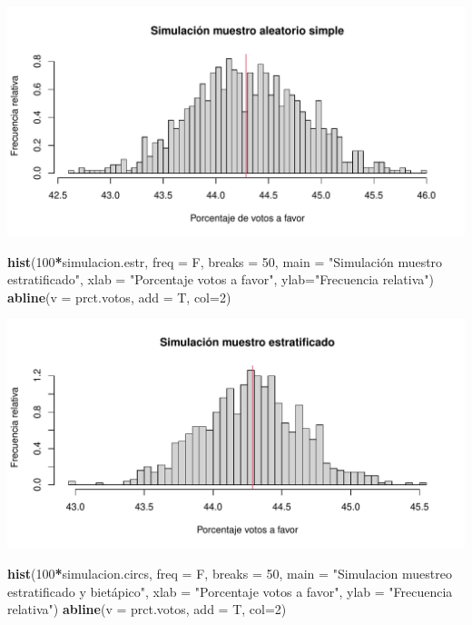 \documentclass[
]{article}
\newenvironment{Shaded}{\begin{snugshade}}{\end{snugshade}}
\newcommand{\DataTypeTok}[1]{\textcolor[rgb]{0.13,0.29,0.53}{#1}}
\newcommand{\DecValTok}[1]{\textcolor[rgb]{0.00,0.00,0.81}{#1}}
\newcommand{\KeywordTok}[1]{\textcolor[rgb]{0.13,0.29,0.53}{\textbf{#1}}}
\newcommand{\NormalTok}[1]{#1}
\newcommand{\OperatorTok}[1]{\textcolor[rgb]{0.81,0.36,0.00}{\textbf{#1}}}
\newcommand{\StringTok}[1]{\textcolor[rgb]{0.31,0.60,0.02}{#1}}
\begin{document}
\includegraphics{ex-03_files/figure-latex/unnamed-chunk-10-1.pdf}

\begin{Shaded}
\begin{Highlighting}[]
\KeywordTok{hist}\NormalTok{(}\DecValTok{100}\OperatorTok{*}\NormalTok{simulacion.estr, }\DataTypeTok{freq =}\NormalTok{ F, }\DataTypeTok{breaks =} \DecValTok{50}\NormalTok{, }
     \DataTypeTok{main =} \StringTok{"Simulación muestro estratificado"}\NormalTok{,}
     \DataTypeTok{xlab =} \StringTok{"Porcentaje votos a favor"}\NormalTok{, }\DataTypeTok{ylab=}\StringTok{"Frecuencia relativa"}\NormalTok{)}
\KeywordTok{abline}\NormalTok{(}\DataTypeTok{v =}\NormalTok{ prct.votos, }\DataTypeTok{add =}\NormalTok{ T, }\DataTypeTok{col=}\DecValTok{2}\NormalTok{)}
\end{Highlighting}
\end{Shaded}

\includegraphics{ex-03_files/figure-latex/unnamed-chunk-10-2.pdf}

\begin{Shaded}
\begin{Highlighting}[]
\KeywordTok{hist}\NormalTok{(}\DecValTok{100}\OperatorTok{*}\NormalTok{simulacion.circs, }\DataTypeTok{freq =}\NormalTok{ F, }\DataTypeTok{breaks =} \DecValTok{50}\NormalTok{,}
     \DataTypeTok{main =} \StringTok{"Simulacion muestreo estratificado y bietápico"}\NormalTok{,}
     \DataTypeTok{xlab =} \StringTok{"Porcentaje votos a favor"}\NormalTok{, }\DataTypeTok{ylab =} \StringTok{"Frecuencia relativa"}\NormalTok{)}
\KeywordTok{abline}\NormalTok{(}\DataTypeTok{v =}\NormalTok{ prct.votos, }\DataTypeTok{add =}\NormalTok{ T, }\DataTypeTok{col=}\DecValTok{2}\NormalTok{)}
\end{Highlighting}
\end{Shaded}
\end{document}
